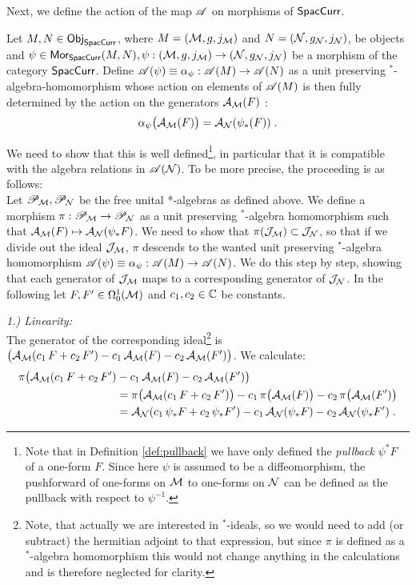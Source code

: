 %
%
%
%
%
%
Next, we define the action of the map $\AA$ on morphisms of $\SpacCurr$.
%
\begin{definition}\label{def:morphism_alpha_psi}
Let $M,N\in \mathsf{Obj}_\SpacCurr$, where $M=(\M,g,j_\M)$ and $N=(\N,g_\N,j_\N)$, be objects and $\psi \in \textsf{Mor}_\SpacCurr(M,N), \psi: (\M,g,j_\M) \to (\N,g_\N,j_\N)$ be a morphism of the category $\SpacCurr$.
Define $\AA(\psi) \equiv \alpha_\psi : \AA(M) \to \AA(N)$ as a unit preserving $^*$-algebra-homomorphism whose action on elements of $\AA(M)$ is then fully determined by the action on the generators $\A_\M(F)$ :
\begin{align}
\alpha_\psi \big(\A_\M(F)\big) = \A_\N(\psi_*(F)) \formspace.
\end{align}
\end{definition}
%
%
We need to show that this is well defined\footnote{Note that in Definition \ref{def:pullback} we have only defined the \emph{pullback} $\psi^* F$ of a one-form $F$. Since here $\psi$ is assumed to be a diffeomorphism, the pushforward of one-forms on $\M$ to one-forms on $\N$ can be defined as the pullback with respect to $\psi^{-1}$.}, in particular that it is compatible with the algebra relations in $\AA(\N)$. To be more precise, the proceeding is as follows:\\
Let $\PPM,\PPN$ be the free unital *-algebras as defined above. We define a morphism $\pi : \PPM \to \PPN$ as a unit preserving $^*$-algebra homomorphism such that $\A_\M(F) \mapsto \A_\N(\psi_* F)$. We need to show that $\pi(\mathcal{J}_\M) \subset \mathcal{J}_\N$, so that if we divide out the ideal $\mathcal{J}_\M$, $\pi$ descends to the wanted unit preserving $^*$-algebra homomorphism $\AA(\psi) \equiv \alpha_\psi : \AA(M) \to \AA(N)$. We do this step by step, showing that each generator of $\mathcal{J}_\M$ maps to a corresponding generator of $\mathcal{J_\N}$. In the following let  $F,F' \in \Omega^1_0(\M)$ and $c_1,c_2 \in \IC$ be constants.\par
%
%
%
\textit{1.) Linearity:}\\
The generator of the corresponding ideal\footnote{Note, that actually we are interested in $^*$-ideals, so we would need to add (or subtract) the hermitian adjoint to that expression, but since $\pi$ is defined as a $^*$-algebra homomorphism this would not change anything in the calculations and is therefore neglected for clarity.} is $\big( \A_\M (c_1\,F+ c_2\,F') -   c_1\, \A_\M (F) - c_2\, \A_\M (F')  \big)$. We calculate:
\begin{align}
\pi \big( \A_\M (c_1\,F+ c_2\,F') &-   c_1\, \A_\M (F) - c_2\, \A_\M (F')  \big) \notag\\
&=  \pi \big( \A_\M (c_1\,F+ c_2\,F') \big)  -  c_1\, \pi \big(  \A_\M (F) \big) - c_2\, \pi \big( \A_\M (F')  \big) \notag\\
&= \A_\N (c_1\, \psi_* F+ c_2\,\psi_*F') -  c_1\,  \A_\N (\psi_*F) - c_2\,  \A_\N (\psi_*F') \formspace.
\end{align}
